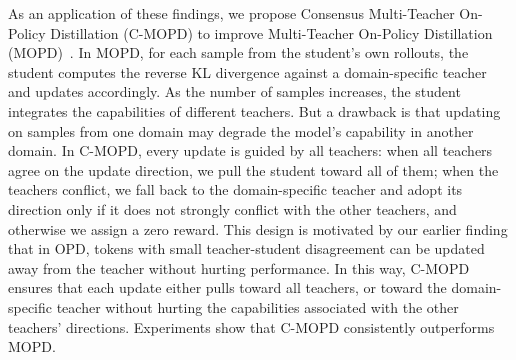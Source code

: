\documentclass{article}
\theoremstyle{remark}
\begin{document}
As an application of these findings, we propose Consensus Multi-Teacher On-Policy Distillation (C-MOPD) to improve Multi-Teacher On-Policy Distillation (MOPD)~\citep{ma2026mopd,blakeman2025nvidia,team2026kimi}. In MOPD, for each sample from the student's own rollouts, the student computes the reverse KL divergence against a domain-specific teacher and updates accordingly. As the number of samples increases, the student integrates the capabilities of different teachers. But a drawback is that updating on samples from one domain may degrade the model's capability in another domain. In C-MOPD, every update is guided by all teachers: when all teachers agree on the update direction, we pull the student toward all of them; when the teachers conflict, we fall back to the domain-specific teacher and adopt its direction only if it does not strongly conflict with the other teachers, and otherwise we assign a zero reward. This design is motivated by our earlier finding that in OPD, tokens with small teacher-student disagreement can be updated away from the teacher without hurting performance. In this way, C-MOPD ensures that each update either pulls toward all teachers, or toward the domain-specific teacher without hurting the capabilities associated with the other teachers' directions. Experiments show that C-MOPD consistently outperforms MOPD.


\end{document}
